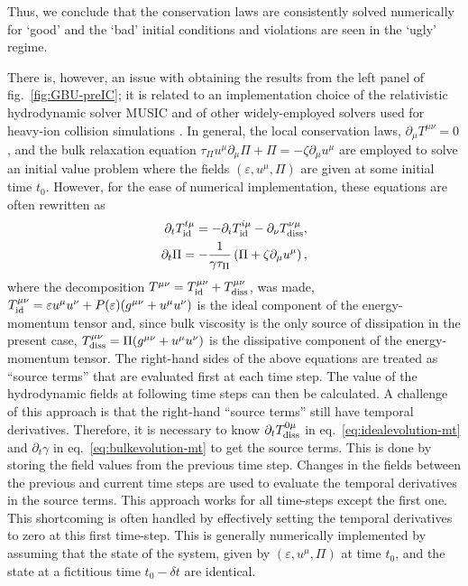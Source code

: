 \documentclass[aps, prd, showkeys,superscriptaddress, nofootinbib,floatfix]{revtex4-2}
\begin{document}
	 Thus, we conclude that the conservation laws are consistently solved numerically for `good' and the `bad' initial conditions and violations are seen in the `ugly' regime.
		
	There is, however, an issue with obtaining the results from the left panel of fig.~\ref{fig:GBU-preIC}; it is related to an implementation choice of the relativistic hydrodynamic solver MUSIC and of other  widely-employed solvers used for heavy-ion collision simulations \cite{Paquet:2015lta,Shen:2014vra,Nijs:2020roc,Molnar:2009tx}. 
	 In general, the local conservation laws, $\partial_{\mu}T^{\mu \nu} = 0$, and the bulk relaxation equation $\tau_\Pi u^\mu \partial_\mu\Pi + \Pi = -\zeta\partial_\mu u^\mu$ are employed to solve an initial value problem where the fields $(\varepsilon, u^{\mu}, \Pi)$ are given at some initial time $t_0$. However, for the ease of numerical implementation, these equations are often rewritten as
	\begin{align}
		\partial_t T^{t\mu}_{\rm id} = -\partial_i T^{i\mu}_{\rm id} - \partial_\nu T_{\rm diss}^{\nu\mu}\label{eq:idealevolution-mt},\\
		\partial_t\Pi = -\frac{1}{\gamma\tau_\Pi}\left(\Pi + \zeta\partial_{\mu}u^{\mu}\right),\label{eq:bulkevolution-mt}
	\end{align}
	where the decomposition $T^{\mu\nu} = T^{\mu\nu}_{\rm id} + T_{\rm diss}^{\mu\nu}$, was made, $T^{\mu\nu}_{\rm id} = \varepsilon u^{\mu}u^{\nu} + P(\varepsilon)(g^{\mu \nu} +  u^\mu u^\nu)$ is the ideal component of the energy-momentum tensor and, since bulk viscosity is the only source of dissipation in the present case, $T_{\rm diss}^{\mu\nu} = \Pi(g^{\mu\nu} + u^\mu u^\nu)$ is the dissipative component of the energy-momentum tensor. The right-hand sides of the above equations are treated as ``source terms'' that are evaluated first at each time step. The value of the hydrodynamic fields at following time steps can then be calculated.
	A challenge of this approach is that the right-hand ``source terms'' still have temporal derivatives. Therefore, it is necessary to know $\partial_t T_{\rm diss}^{0\mu}$ in eq.~\eqref{eq:idealevolution-mt} and $\partial_t\gamma$ in eq.~\eqref{eq:bulkevolution-mt} to get the source terms. This is done by storing the field values from the previous time step. Changes in the fields between the previous and current time steps are used to evaluate the temporal derivatives in the source terms.  This approach works for all time-steps except the first one. This shortcoming is often handled by effectively setting the temporal derivatives to zero at this first time-step. This is generally numerically implemented by assuming that the state of the system, given by $(\varepsilon, u^{\mu}, \Pi)$ at time $t_0$, and the state at a fictitious time $t_0-\delta t$ are identical. 
\end{document}
